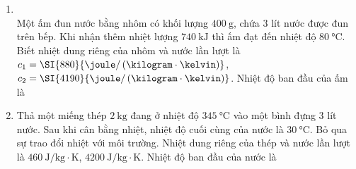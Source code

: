 \begin{enumerate}[label=\bfseries Câu \arabic*:, leftmargin=1.7cm]
\item {}\\
Một ấm đun nước bằng nhôm có khối lượng $\SI{400}{\gram}$, chứa 3 lít nước được đun trên bếp. Khi nhận thêm nhiệt lượng $\SI{740}{\kilo\joule}$ thì ấm đạt đến nhiệt độ $\SI{80}{\celsius}$. Biết nhiệt dung riêng của nhôm và nước lần lượt là $c_1=\SI{880}{\joule/\left(\kilogram\cdot\kelvin\right)}$, $c_2=\SI{4190}{\joule/\left(\kilogram\cdot\kelvin\right)}$. Nhiệt độ ban đầu của ấm là

\item Thả một miếng thép $\SI{2}{\kilogram}$ đang ở nhiệt độ $\SI{345}{\celsius}$ vào một bình đựng 3 lít nước. Sau khi cân bằng nhiệt, nhiệt độ cuối cùng của nước là $\SI{30}{\celsius}$. Bỏ qua sự trao đổi nhiệt với môi trường. Nhiệt dung riêng của thép và nước lần lượt là $\SI{460}{\joule/\kilogram\cdot\kelvin}$, $\SI{4200}{\joule/\kilogram\cdot\kelvin}$. Nhiệt độ ban đầu của nước là


\end{enumerate}
